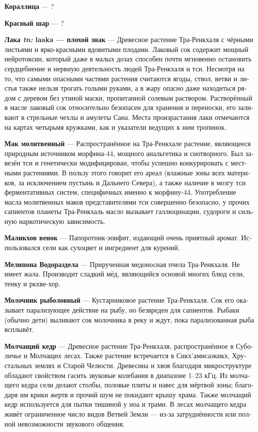 \documentclass[a4paper,12pt,fleqn]{book}\usepackage{polyglossia}\setdefaultlanguage[babelshorthands=true]{russian}\setotherlanguage{english}\defaultfontfeatures{Ligatures=TeX,Mapping=tex-text}\usepackage{xcolor}\newcommand{\ml}[3]{#2}
\newcommand{\theterm}[3]{\textbf{\hypertarget{#1}{#2}} --- #3}
\newcommand{\theorigin}[3]{\textit{#1:} #2 --- #3}
\begin{document}
\theterm{coraldrake}
{Кораллица}
{?}

\theterm{redball}
{Красный шар}
{?}

\theterm{laaka} %
{Лака \theorigin{tn}{laaka}{плохой знак}}
{Древесное растение Тра-Ренкхаля с чёрными листьями и ярко-красными ядовитыми плодами.
Лаковый сок содержит мощный нейротоксин, который даже в малых дозах способен почти мгновенно остановить сердцебиение и нервную деятельность людей Тра-Ренкхаля и тси.
Несмотря на то, что самыми опасными частями растения считаются ягоды, ствол, ветви и листья также нельзя трогать голыми руками, а в жару опасно даже находиться рядом с деревом без утиной маски, пропитанной солевым раствором.
Растворённый в масле лаковый сок относительно безопасен для хранения и переноски, его заливают в стрельные чехлы и амулеты Сана.
Места произрастания лаки отмечаются на картах четырьмя кружками, как и указатели ведущих к ним тропинок.}

\theterm{praypoppy}
{Мак молитвенный}
{Распространённое на Тра-Ренкхале растение, являющееся природным источником морфина-44, мощного анальгетика и снотворного.
Был завезён тси и генетически модифицирован, чтобы успешно конкурировать с местными растениями.
В пользу этого говорит его ареал (влажные зоны всех материков, за исключением пустынь и Дальнего Севера), а также наличие в мозгу тси ферментативных систем, специфичных именно к морфину-44.
Употребление масла молитвенных маков представителями тси совершенно безопасно, у прочих сапиентов планеты Тра-Ренкхаль масло вызывает галлюцинации, судороги и сильную наркотическую зависимость.}

\theterm{wreath-of-malikch}
{Маликхов венок}
{Папоротник-эпифит, издающий очень приятный аромат.
Использовался сели как сухоцвет и ингредиент для курений.}

\theterm{melipona}
{Мелипона Водораздела}
{Прирученная медоносная пчела Тра-Ренкхаля.
Не имеет жала.
Производит сладкий мёд, являющийся основой многих блюд сели, тенку и ркхве-хор.}

\theterm{milkbush-of-fisher}
{Молочник рыболовный}
{Кустарниковое растение Тра-Ренкхаля.
Сок его оказывает парализующее действие на рыбу, но безвреден для сапиентов.
Рыбаки (обычно дети) выливают сок молочника в реку и ждут, пока парализованная рыба всплывёт.}

\theterm{silent-cedar} %
{Молчащий кедр}
{Древесное растение Тра-Ренкхаля, распространённое в Суболичье и Молчащих лесах.
Также растение встречается в Сикх'амисаэкикх, Хрустальных землях и Старой Челюсти.
Древесина и хвоя благодаря микроструктуре обладают свойством гасить звуковые колебания в диапазоне 1--23 кГц.
Из молчащего кедра сели делают столбы, половые плиты и навес для мёртвой зоны;
благодаря им крики жертв и прочий шум не покидают крышу храма.
Также молчащий кедр используется для пытки тишиной у ноа и трами.
В лесах молчащего кедра живёт ограниченное число видов Ветвей Земли --- из-за затруднённости или полной невозможности звукового общения.}
\end{document}
